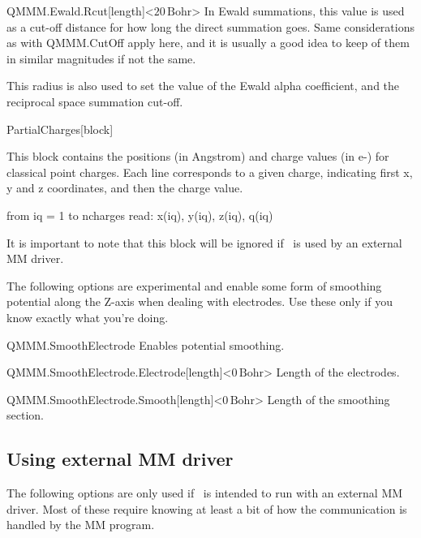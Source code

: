  \begin{fdfentry}{QMMM.Ewald.Rcut}[length]<$20\,\mathrm{Bohr}$>
  In Ewald summations, this value is used as a cut-off distance for
  how long the direct summation goes. Same considerations as with
  QMMM.CutOff apply here, and it is usually a good idea to keep of
  them in similar magnitudes if not the same.

  This radius is also used to set the value of the Ewald alpha coefficient,
  and the reciprocal space summation cut-off.

 \end{fdfentry}

 \begin{fdfentry}{PartialCharges}[block]

  This block contains the positions (in Angstrom) and charge values (in e-)
  for classical point charges. Each line corresponds to a given charge,
  indicating first x, y and z coordinates, and then the charge value.

  \begin{shellexample}
       from iq = 1 to ncharges
            read: x(iq), y(iq), z(iq), q(iq)
  \end{shellexample}

  It is important to note that this block will be ignored if \siesta\ is
  used by an external MM driver.
 \end{fdfentry}

 The following options are experimental and enable some form of
 smoothing potential along the Z-axis when dealing with electrodes.
 Use these only if you know exactly what you're doing.

 \begin{fdflogicalF}{QMMM.SmoothElectrode}
  Enables potential smoothing.

 \end{fdflogicalF}

 \begin{fdfentry}{QMMM.SmoothElectrode.Electrode}[length]<$0\,\mathrm{Bohr}$>
  Length of the electrodes.

 \end{fdfentry}

 \begin{fdfentry}{QMMM.SmoothElectrode.Smooth}[length]<$0\,\mathrm{Bohr}$>
  Length of the smoothing section.

 \end{fdfentry}

 \subsection{Using external MM driver}
 The following options are only used if \siesta\ is intended to run
 with an external MM driver. Most of these require knowing at least
 a bit of how the communication is handled by the MM program.

